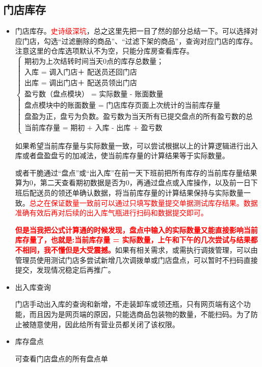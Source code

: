 \documentclass[UTF8]{ctexart}
\begin{document}
\subsection{门店库存}
	\begin{itemize}
	
	\item 门店库存。\textcolor{red}{史诗级深坑}，总之这里先把一目了然的部分总结一下。可以选择对应门店，勾选“过滤删除的商品”、“过滤下架的商品”，查询对应门店的库存。注意这里的仓库选项默认不为空，只能分库房查看库存。
$$	
\begin{cases}
	\text{期初为上次结转时间当天0点的库存总数量；} \\
	
	\text{入库 = 调入门店＋ 配送员还回门店 } \\
	
	\text{出库 = 调出门店＋ 配送员领出门店  } \\
	
	\text{盈亏数（盘点模块） = 实际数量 - 账面数量  } \\
	
	\text{盘点模块中的账面数量 = 门店库存页面上次统计的当前库存量} \\
	
	\text{盘盈为正，盘亏为负数。盈亏数为当天所有已提交盘点的所有盈亏数的总和。  } \\
	
	\text{当前库存量 = 期初 + 入库 - 出库 + 盈亏数  } 	
\end{cases}
$$
	
	如果希望当前库存量与实际数量一致，可以尝试根据以上的计算逻辑进行出入库或者盘盈盘亏的加减法，使当前库存量的计算结果等于实际数量。
	
	或者干脆通过“盘点”或“出入库”在前一天下班前把所有库存的当前库存量结果算为0，第二天查看期初数据是否为0，再通过盘点或入库操作，以及前一日下班后配送员的领还单确认数据，将当前库存量的计算结果保持与实际数量一致。\textcolor{red}{总之在保证数量一致前可以通过只填写数量提交单据测试库存结果。数据准确有效后再对后续的出入库气瓶进行扫码和数据提交即可。}
	
	\textcolor{red}{\textbf{但是当我把公式计算通的时候发现，盘点中输入的实际数量又能直接影响当前库存量了，也就是:当前库存量 = 实际数量，上午和下午的几次尝试与结果都不相同，我不懂但是大受震撼。}}如果有相关需求，或需执行调拨管理，可以由管理员使用测试门店多尝试新增几次调拨单或门店盘点，可以暂时不扫码直接提交，发现情况稳定后再推广。
	
	
	\item 出入库查询
	
	门店手动出入库的查询和新增，不走装卸车或领还瓶，只有网页端有这个功能，而且因为是网页端的原因，只能选商品包装物的数量，不能扫码。为了防止被随意使用，因此给所有营业员都关闭了该权限。
	
	\item 库存盘点
	
	可查看门店盘点的所有盘点单
	
	
	
\end{itemize}
\end{document}
